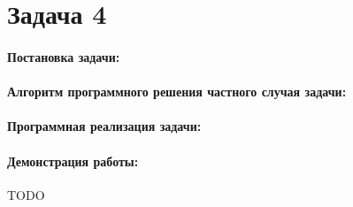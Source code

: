 {
   \section*{Задача 4}
   \paragraph{Постановка задачи:}
   \paragraph{Алгоритм программного решения частного случая задачи:}
   \paragraph{Программная реализация задачи:}
   \paragraph{Демонстрация работы:}
   TODO %
}
